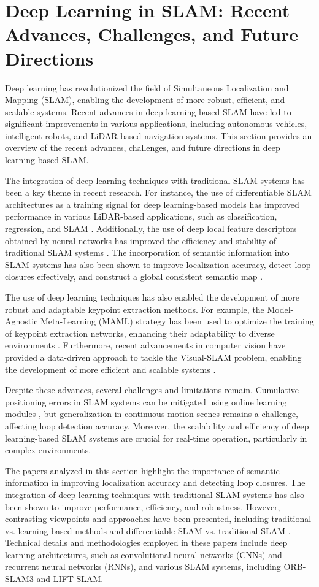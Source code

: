 \documentclass[conference]{IEEEtran}
\begin{document}
\section{Deep Learning in SLAM: Recent Advances, Challenges, and Future Directions}
Deep learning has revolutionized the field of Simultaneous Localization and Mapping (SLAM), enabling the development of more robust, efficient, and scalable systems. Recent advances in deep learning-based SLAM have led to significant improvements in various applications, including autonomous vehicles, intelligent robots, and LiDAR-based navigation systems. This section provides an overview of the recent advances, challenges, and future directions in deep learning-based SLAM.

The integration of deep learning techniques with traditional SLAM systems has been a key theme in recent research. For instance, the use of differentiable SLAM architectures as a training signal for deep learning-based models has improved performance in various LiDAR-based applications, such as classification, regression, and SLAM \cite{b1}. Additionally, the use of deep local feature descriptors obtained by neural networks has improved the efficiency and stability of traditional SLAM systems \cite{b2}. The incorporation of semantic information into SLAM systems has also been shown to improve localization accuracy, detect loop closures effectively, and construct a global consistent semantic map \cite{b3}.

The use of deep learning techniques has also enabled the development of more robust and adaptable keypoint extraction methods. For example, the Model-Agnostic Meta-Learning (MAML) strategy has been used to optimize the training of keypoint extraction networks, enhancing their adaptability to diverse environments \cite{b4}. Furthermore, recent advancements in computer vision have provided a data-driven approach to tackle the Visual-SLAM problem, enabling the development of more efficient and scalable systems \cite{b5}.

Despite these advances, several challenges and limitations remain. Cumulative positioning errors in SLAM systems can be mitigated using online learning modules \cite{b4}, but generalization in continuous motion scenes remains a challenge, affecting loop detection accuracy. Moreover, the scalability and efficiency of deep learning-based SLAM systems are crucial for real-time operation, particularly in complex environments.

The papers analyzed in this section highlight the importance of semantic information in improving localization accuracy and detecting loop closures. The integration of deep learning techniques with traditional SLAM systems has also been shown to improve performance, efficiency, and robustness. However, contrasting viewpoints and approaches have been presented, including traditional vs. learning-based methods \cite{b5} and differentiable SLAM vs. traditional SLAM \cite{b1}. Technical details and methodologies employed in these papers include deep learning architectures, such as convolutional neural networks (CNNs) and recurrent neural networks (RNNs), and various SLAM systems, including ORB-SLAM3 and LIFT-SLAM.
\end{document}
